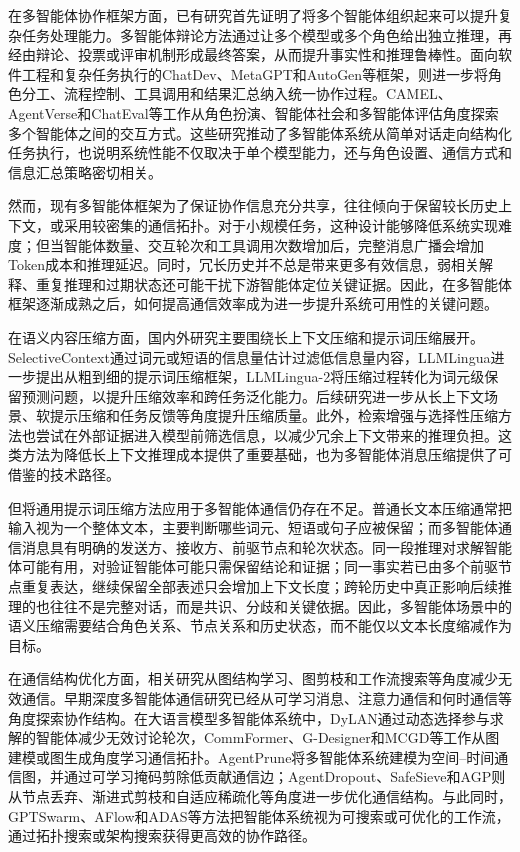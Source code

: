 在多智能体协作框架方面，已有研究首先证明了将多个智能体组织起来可以提升复杂任务处理能力。多智能体辩论方法通过让多个模型或多个角色给出独立推理，再经由辩论、投票或评审机制形成最终答案，从而提升事实性和推理鲁棒性\cite{ref31,ref34}。面向软件工程和复杂任务执行的ChatDev\cite{ref9}、MetaGPT\cite{ref35}和AutoGen\cite{ref36}等框架，则进一步将角色分工、流程控制、工具调用和结果汇总纳入统一协作过程。CAMEL\cite{ref37}、AgentVerse\cite{ref79}和ChatEval\cite{ref80}等工作从角色扮演、智能体社会和多智能体评估角度探索多个智能体之间的交互方式。这些研究推动了多智能体系统从简单对话走向结构化任务执行，也说明系统性能不仅取决于单个模型能力，还与角色设置、通信方式和信息汇总策略密切相关。

然而，现有多智能体框架为了保证协作信息充分共享，往往倾向于保留较长历史上下文，或采用较密集的通信拓扑。对于小规模任务，这种设计能够降低系统实现难度；但当智能体数量、交互轮次和工具调用次数增加后，完整消息广播会增加Token成本和推理延迟。同时，冗长历史并不总是带来更多有效信息，弱相关解释、重复推理和过期状态还可能干扰下游智能体定位关键证据。因此，在多智能体框架逐渐成熟之后，如何提高通信效率成为进一步提升系统可用性的关键问题。

在语义内容压缩方面，国内外研究主要围绕长上下文压缩和提示词压缩展开。SelectiveContext\cite{ref55}通过词元或短语的信息量估计过滤低信息量内容，LLMLingua\cite{ref56}进一步提出从粗到细的提示词压缩框架，LLMLingua-2\cite{ref57}将压缩过程转化为词元级保留预测问题，以提升压缩效率和跨任务泛化能力。后续研究进一步从长上下文场景、软提示压缩和任务反馈等角度提升压缩质量\cite{ref85,ref86,ref58}。此外，检索增强与选择性压缩方法也尝试在外部证据进入模型前筛选信息，以减少冗余上下文带来的推理负担\cite{ref88,ref91,ref92}。这类方法为降低长上下文推理成本提供了重要基础，也为多智能体消息压缩提供了可借鉴的技术路径。

但将通用提示词压缩方法应用于多智能体通信仍存在不足。普通长文本压缩通常把输入视为一个整体文本，主要判断哪些词元、短语或句子应被保留；而多智能体通信消息具有明确的发送方、接收方、前驱节点和轮次状态。同一段推理对求解智能体可能有用，对验证智能体可能只需保留结论和证据；同一事实若已由多个前驱节点重复表达，继续保留全部表述只会增加上下文长度；跨轮历史中真正影响后续推理的也往往不是完整对话，而是共识、分歧和关键依据。因此，多智能体场景中的语义压缩需要结合角色关系、节点关系和历史状态，而不能仅以文本长度缩减作为目标。

在通信结构优化方面，相关研究从图结构学习、图剪枝和工作流搜索等角度减少无效通信。早期深度多智能体通信研究已经从可学习消息、注意力通信和何时通信等角度探索协作结构\cite{ref93,ref94,ref95}。在大语言模型多智能体系统中，DyLAN\cite{ref39}通过动态选择参与求解的智能体减少无效讨论轮次，CommFormer\cite{ref40}、G-Designer\cite{ref41}和MCGD\cite{ref42}等工作从图建模或图生成角度学习通信拓扑。AgentPrune\cite{ref43}将多智能体系统建模为空间--时间通信图，并通过可学习掩码剪除低贡献通信边；AgentDropout\cite{ref44}、SafeSieve\cite{ref45}和AGP\cite{ref46}则从节点丢弃、渐进式剪枝和自适应稀疏化等角度进一步优化通信结构。与此同时，GPTSwarm\cite{ref48}、AFlow\cite{ref50}和ADAS\cite{ref99}等方法把智能体系统视为可搜索或可优化的工作流，通过拓扑搜索或架构搜索获得更高效的协作路径。

